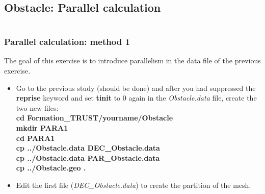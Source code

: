 \documentclass[10pt, hyperref={unicode=true,pdfusetitle, bookmarks=true,bookmarksnumbered=false,bookmarksopen=false, breaklinks=false,pdfborder={0 0 1},backref=true,colorlinks=true,linkcolor=darkblue,pageanchor}]{beamer}
\begin{document}
\subsection{Obstacle: Parallel calculation} \label{exo_para_1}
\begin{frame}
\begin{columns}[c] 
\tableofcontents[sections={1-9},currentsection, currentsubsection]
\tableofcontents[sections={10-16},currentsection, currentsubsection]
\end{columns}
\end{frame}
\begin{frame}
\frametitle{Parallel calculation: method 1}
\begin{block}{}

The goal of this exercise is to introduce parallelism in the data file of the previous exercise.

\begin{itemize}
\item Go to the previous study (should be done) and after you had suppressed the \textbf{reprise} keyword and set \textbf{tinit} to 0 again in the \textit{Obstacle.data} file, create the two new files:\\
\textbf{cd Formation\_TRUST/yourname/Obstacle} \\
\textbf{mkdir PARA1} \\
\textbf{cd PARA1} \\
\textbf{cp ../Obstacle.data DEC\_Obstacle.data} \\
\textbf{cp ../Obstacle.data PAR\_Obstacle.data} \\
\textbf{cp ../Obstacle.geo .}\\
\vspace{0.3cm}
\item Edit the first file (\textit{DEC\_Obstacle.data}) to create the partition of the mesh.
\end{itemize}

\end{block}
\end{frame}
\end{document}
